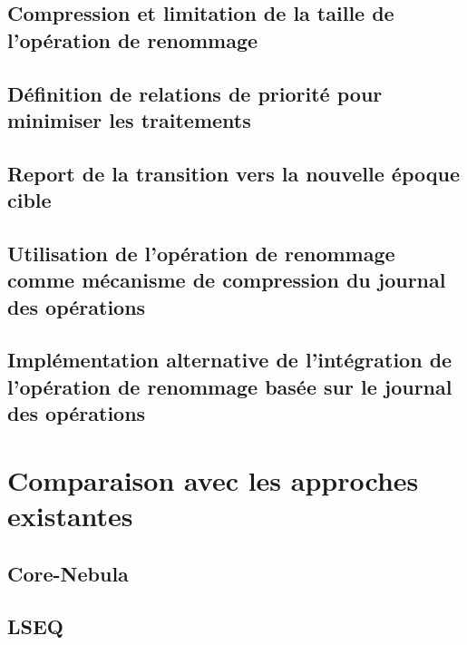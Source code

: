 \subsection{Compression et limitation de la taille de l'opération de renommage}
\label{sec:compression-rename}


\subsection{Définition de relations de priorité pour minimiser les traitements}
\label{sec:alt-priority-relation}


\subsection{Report de la transition vers la nouvelle époque cible}
\label{sec:report-transition-to-target-epoch}


\subsection{Utilisation de l'opération de renommage comme mécanisme de compression du journal des opérations}
\label{sec:rename-as-compression-mechanism}


\subsection{Implémentation alternative de l'intégration de l'opération de renommage basée sur le journal des opérations}
\label{sec:log-based-rename-mechanism}



\section{Comparaison avec les approches existantes}
\label{sec:rls-related-work}
\subsection{Core-Nebula}


\subsection{LSEQ}



